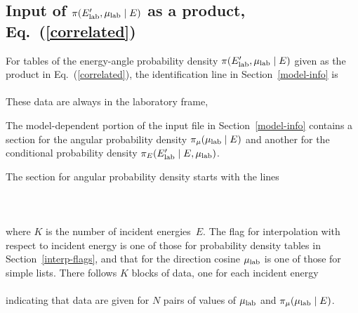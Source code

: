 \\
 \\
\\
\\
\\
\\
\\
\\
\\
\\

\subsection{Input of $\pi(E_{\text{lab}}', \mu_{\text{lab}} \mid E)$ as a product, Eq.~(\ref{correlated})}
For tables of the energy-angle probability density $\pi(E_{\text{lab}}', \mu_{\text{lab}} \mid E)$
given as the product in Eq.~(\ref{correlated}), the identification line in
Section~\ref{model-info} is\\
      \\
These data are always in the laboratory frame,\\

The model-dependent portion of the input file in Section~\ref{model-info}
contains a section for the angular probability density $\pi_\mu(\mu_{\text{lab}} \mid E)$
and another for the conditional probability density $\pi_E(E_{\text{lab}}' \mid E, \mu_{\text{lab}})$.

The section for angular probability density starts with the lines\\
  \\
  \\
  \\
where $K$ is the number of incident energies~$E$.  The flag for
interpolation with respect to incident energy is one of those for
probability density tables in Section~\ref{interp-flags}, and that for 
the direction cosine $\mu_{\text{lab}}$ is one of those 
for simple lists.  There follows $K$ blocks of data,
one for each incident energy\\
    \\
indicating that data are given for $N$ pairs of values of $\mu_{\text{lab}}$
and $\pi_\mu(\mu_{\text{lab}} \mid E)$.

